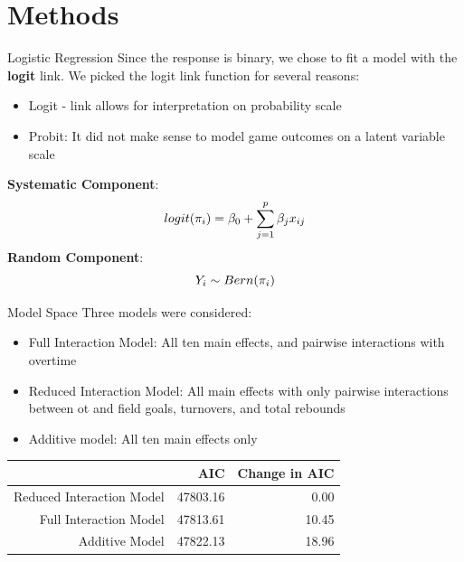 \documentclass{beamer}
\begin{document}
	
	\section{Methods}
	
	\begin{frame}[t]{Logistic Regression}
	Since the response is binary, we chose to fit a model with the \textbf{logit} link. We picked the logit link function for several reasons: 
	\begin{itemize}
		\item Logit - link allows for interpretation on probability scale
		\item Probit: It did not make sense to model game outcomes on a latent variable scale
		
	\end{itemize}
\textbf{Systematic Component}: 
\begin{eqnarray} \label{eq:logit}
\centering
logit(\pi_{i})=\beta_{0}+\sum_{j=1}^{p} \beta_{j}x_{ij}
\end{eqnarray} 
\textbf{Random Component}: 
\begin{equation}
\centering
Y_i \sim Bern(\pi_i)
\end{equation}
	\end{frame}
	

\begin{frame}{Model Space}
Three models were considered:
\begin{itemize}
	\item Full Interaction Model: All ten main effects, and pairwise interactions with overtime
	\item Reduced Interaction Model: All main effects with only pairwise interactions between ot and field goals, turnovers, and total rebounds
	\item Additive model: All ten main effects only
\end{itemize}
\begin{table}[h]
	\centering
	\begin{tabular}{rrr}
		\hline
		& AIC & Change in AIC \\ 
		\hline
		Reduced Interaction Model & 47803.16 & 0.00 \\ 
		Full Interaction Model & 47813.61 & 10.45 \\ 
		Additive Model & 47822.13 & 18.96 \\ 
		\hline
	\end{tabular}
\end{table}
\end{frame}	
	
\end{document}
